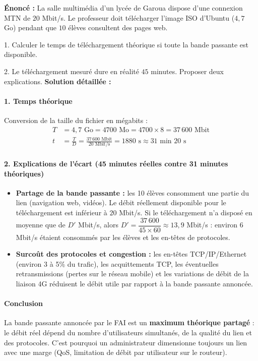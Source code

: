 \documentclass[11pt]{article}
\begin{document}
\begin{exoresolu}
\textbf{Énoncé :} La salle multimédia d'un lycée de Garoua dispose d'une connexion MTN de $20$ Mbit/s. Le professeur doit télécharger l'image ISO d'Ubuntu ($4,7$ Go) pendant que $10$ élèves consultent des pages web.\par
1. Calculer le temps de téléchargement théorique si toute la bande passante est disponible.\par
2. Le téléchargement mesuré dure en réalité $45$ minutes. Proposer deux explications.
\tcblower
\textbf{Solution détaillée :}

\paragraph{1. Temps théorique}
Conversion de la taille du fichier en mégabits :
\begin{align*}
T &= 4,7 \text{ Go} = 4700 \text{ Mo} = 4700 \times 8 = 37\,600 \text{ Mbit}\\
t &= \frac{T}{D} = \frac{37\,600 \text{ Mbit}}{20 \text{ Mbit/s}} = 1880 \text{ s} \approx 31 \text{ min } 20 \text{ s}
\end{align*}

\paragraph{2. Explications de l'écart (45 minutes réelles contre 31 minutes théoriques)}
\begin{itemize}
    \item \textbf{Partage de la bande passante :} les 10 élèves consomment une partie du lien (navigation web, vidéos). Le débit réellement disponible pour le téléchargement est inférieur à $20$ Mbit/s. Si le téléchargement n'a disposé en moyenne que de $D'$ Mbit/s, alors $D' = \dfrac{37\,600}{45 \times 60} \approx 13,9$ Mbit/s : environ $6$ Mbit/s étaient consommés par les élèves et les en-têtes de protocoles.
    \item \textbf{Surcoût des protocoles et congestion :} les en-têtes TCP/IP/Ethernet (environ 3 à 5\% du trafic), les acquittements TCP, les éventuelles retransmissions (pertes sur le réseau mobile) et les variations de débit de la liaison 4G réduisent le débit utile par rapport à la bande passante annoncée.
\end{itemize}

\paragraph{Conclusion}
La bande passante annoncée par le FAI est un \textbf{maximum théorique partagé} : le débit réel dépend du nombre d'utilisateurs simultanés, de la qualité du lien et des protocoles. C'est pourquoi un administrateur dimensionne toujours un lien avec une marge (QoS, limitation de débit par utilisateur sur le routeur).
\end{exoresolu}
\end{document}

